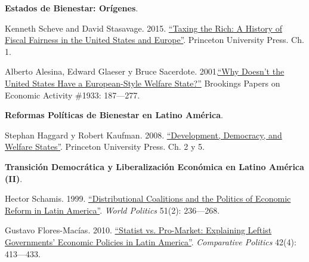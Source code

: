 \documentclass[letterpaper]{article}
\renewenvironment{itemize}{
  \begin{list}{}{
    \setlength{\leftmargin}{1.5em}
  }
}{
  \end{list}
}
\begin{document}
\begin{enumerate}[label=\roman*.]
\begin{itemize}
			\item[17.] {\bf Estados de Bienestar: Or\'igenes}.
				\begin{itemize}
					\item[$\circ$] Kenneth Scheve and David Stasavage. 2015. \href{https://github.com/hbahamonde/Ciencia_Politica_II/raw/master/Readings/Taxing_The_Rich.pdf}{``Taxing the Rich: A History of Fiscal Fairness in the United States and Europe''}. Princeton University Press. Ch. 1.
					\item[$\circ$] Alberto Alesina, Edward Glaeser y Bruce Sacerdote. 2001.\href{https://github.com/hbahamonde/Ciencia_Politica_II/raw/master/Readings/Alesina_et_al.pdf}{``Why Doesn't the United States Have a European-Style Welfare State?''} Brookings Papers on Economic Activity \#1933: 187---277.
				\end{itemize}


			\item[18.] {\bf Reformas Pol\'iticas de Bienestar en Latino Am\'erica}.
				\begin{itemize}
					\item[$\circ$] Stephan Haggard y Robert Kaufman. 2008. \href{https://github.com/hbahamonde/Ciencia_Politica_II/raw/master/Readings/Kaufman_Welfare.pdf}{``Development, Democracy, and Welfare States''}. Princeton University Press. Ch. 2 y 5.
        \end{itemize}


			\item[19.] {\bf Transici\'on Democr\'atica y Liberalizaci\'on Econ\'omica en Latino Am\'erica (II)}.
				\begin{itemize}
					\item[$\circ$] Hector Schamis. 1999. \href{https://github.com/hbahamonde/Ciencia_Politica_II/raw/master/Readings/Schamis_1999.pdf}{``Distributional Coalitions and the Politics of Economic Reform in Latin America''}. \emph{World Politics} 51(2): 236---268.
					\item[$\circ$] Gustavo Flores-Mac\'ias. 2010.  \href{https://github.com/hbahamonde/Ciencia_Politica_II/raw/master/Readings/Flores_Macias_2010.pdf}{``Statist vs. Pro-Market: Explaining Leftist Governments' Economic Policies in Latin America''}. \emph{Comparative Politics} 42(4): 413---433.
				\end{itemize}



\end{itemize}
\end{enumerate}
\end{document}
